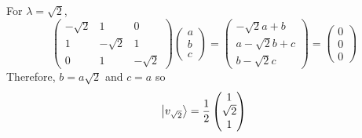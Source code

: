 \documentclass[12pt]{extarticle}
\begin{document}
\begin{enumerate}
For $\lambda = \sqrt{2}$, 
\[
  \begin{pmatrix}
    -\sqrt{2} & 1 & 0 \\
    1 & -\sqrt{2} & 1 \\
    0 & 1 & -\sqrt{2}
  \end{pmatrix}
  \begin{pmatrix}
	a  \\
	b \\
	c
  \end{pmatrix}
  = 
  \begin{pmatrix}
	-\sqrt{2} a + b \\
	a -\sqrt{2} b + c \\
	b - \sqrt{2} c
  \end{pmatrix}
  =
  \begin{pmatrix}
	0 \\
	0 \\
	0
  \end{pmatrix}
\] 
Therefore, $b = a \sqrt{2}$ and $c = a$ so 
\[ \left| v_{\sqrt{2}} \right> = \frac{1}{2} 
  \begin{pmatrix}
	1 \\
	\sqrt{2} \\
	1
  \end{pmatrix}
\]


\end{enumerate}
\end{document}
